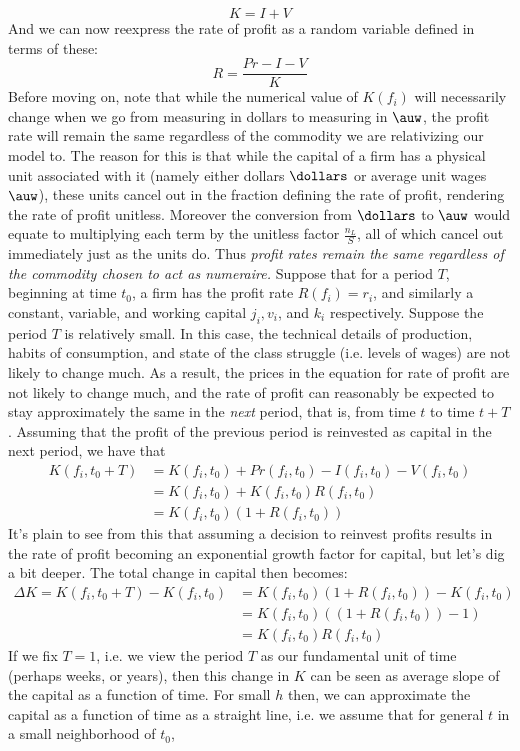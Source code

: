 \[ K = I+V \]
And we can now reexpress the rate of profit as a random variable defined in terms of these:
\[ R = \frac{Pr-I-V}{K} \]
Before moving on, note that while the numerical value of $K(f_i)$ will necessarily change when we go from measuring in dollars to measuring in $\auw$, the profit rate will remain the same regardless of the commodity we are relativizing our model to. The reason for this is that while the capital of a firm has a physical unit associated with it (namely either dollars $\dollars$ or average unit wages $\auw$), these units cancel out in the fraction defining the rate of profit, rendering the rate of profit unitless. Moreover the conversion from $\dollars$ to $\auw$ would equate to multiplying each term by the unitless factor $\frac{n_L}{S}$, all of which cancel out immediately just as the units do. Thus \textit{profit rates remain the same regardless of the commodity chosen to act as numeraire.} 
Suppose that for a period $T$, beginning at time $t_0$, a firm has the profit rate $R(f_i) = r_i$, and similarly a constant, variable, and working capital $j_i,v_i$, and $k_i$ respectively. Suppose the period $T$ is relatively small. In this case, the technical details of production, habits of consumption, and state of the class struggle (i.e. levels of wages) are not likely to change much. As a result, the prices in the equation for rate of profit are not likely to change much, and the rate of profit can reasonably be expected to stay approximately the same in the \textit{next} period, that is, from time $t$ to time $t+T$. Assuming that the profit of the previous period is reinvested as capital in the next period, we have that \begin{align}
	K(f_i,t_0+T) &= K(f_i,t_0)+Pr(f_i,t_0)-I(f_i,t_0)-V(f_i,t_0) \\
			&= K(f_i,t_0) + K(f_i,t_0)R(f_i,t_0) \\
			&= K(f_i,t_0)(1+R(f_i,t_0))
\end{align}
It's plain to see from this that assuming a decision to reinvest profits results in the rate of profit becoming an exponential growth factor for capital, but let's dig a bit deeper. The total change in capital then becomes:
\begin{align}
	\Delta K = K(f_i,t_0+T)-K(f_i,t_0) &= K(f_i,t_0)(1+R(f_i,t_0))-K(f_i,t_0) \\
	&= K(f_i,t_0)((1+R(f_i,t_0))-1) \\
	&= K(f_i,t_0)R(f_i,t_0)
\end{align}
If we fix $T=1$, i.e. we view the period $T$ as our fundamental unit of time (perhaps weeks, or years), then this change in $K$ can be seen as average slope of the capital as a function of time. For small $h$ then, we can approximate the capital as a function of time as a straight line, i.e. we assume that for general $t$ in a small neighborhood of $t_0$, 
